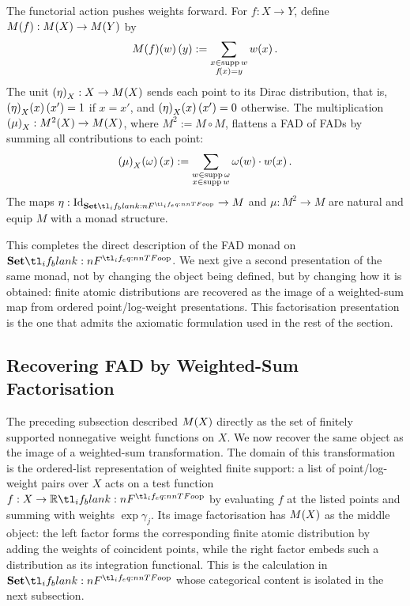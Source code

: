 \documentclass[11pt,a4paper]{article}
\theoremstyle{definition}
\theoremstyle{remark}
\providecommand{\Id}{\mathrm{Id}}
\providecommand{\supp}{\operatorname{supp}}
\begin{document}
The functorial action pushes weights forward. For \(f:X\to Y\), define
\( \Fun[nn]{M}{f}:\Fun[nn]{M}{X}\to\Fun[nn]{M}{Y} \) by
\[
\fn[n]{\Fun[nn]{M}{f}}{w}(y)
:=
\sum_{\substack{x\in\supp w\\ \fn[n]{f}{x}=y}}
\fn[n]{w}{x}.
\]
The unit \( \Nat[nn]{\eta}{X}:X\to\Fun[nn]{M}{X} \) sends each point to its
Dirac distribution, that is,
\( \fn[n]{\Nat[nn]{\eta}{X}}{x}(x')=1 \) if \(x=x'\), and
\( \fn[n]{\Nat[nn]{\eta}{X}}{x}(x')=0 \) otherwise. The multiplication
\( \Nat[nn]{\mu}{X}:\Fun[nn]{M^2}{X}\to\Fun[nn]{M}{X} \), where
\(M^2:=M\circ M\), flattens a FAD of FADs by summing all contributions to each
point:
\[
\fn[n]{\Nat[nn]{\mu}{X}}{\omega}(x)
:=
\sum_{\substack{w\in\supp\omega\\ x\in\supp w}}
\fn[n]{\omega}{w}\cdot\fn[n]{w}{x}.
\]
The maps \( \eta:\Id_{\Set}\to M \) and \( \mu:M^2\to M \) are natural and
equip \(M\) with a monad structure.

This completes the direct description of the FAD monad on \( \Set \). We next
give a second presentation of the same monad, not by changing the object being
defined, but by changing how it is obtained: finite atomic distributions are
recovered as the image of a weighted-sum map from ordered point/log-weight
presentations. This factorisation presentation is the one that admits the
axiomatic formulation used in the rest of the section.

\subsection{Recovering FAD by Weighted-Sum Factorisation}
\label{sec:barycentre-and-weighted-sums}

The preceding subsection described \( \Fun[nn]{M}{X} \) directly as the set of
finitely supported nonnegative weight functions on \(X\). We now recover the
same object as the image of a weighted-sum transformation. The domain of this
transformation is the ordered-list representation of weighted finite support:
a list of point/log-weight pairs over \(X\) acts on a test function
\(f:X\to\R\) by evaluating \(f\) at the listed points and summing with weights
\( \exp\gamma_j \). Its image factorisation has \( \Fun[nn]{M}{X} \) as the
middle object: the left factor forms the corresponding finite atomic
distribution by adding the weights of coincident points, while the right
factor embeds such a distribution as its integration functional. This is the
calculation in \( \Set \) whose categorical content is isolated in the next
subsection.
\end{document}
